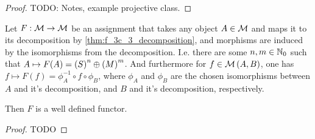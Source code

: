 \begin{lemma}
\begin{enumerate}
{\begin{center}
            \end{center}
        }
    \end{enumerate}
\end{lemma}
\begin{proof}
    TODO: Notes, example projective class.
\end{proof}





\begin{lemma} \label{thm:F_functor} %
    Let \( F: {\mathcal{M}} \to {\mathcal{M}} \) be an assignment that takes any object \( A \in {\mathcal{M}} \) and maps it to its decomposition by \autoref{thm:f_3c_3_decomposition}, and morphisms are induced by the isomorphisms from the decomposition. I.e. there are some \( n, m \in {\mathbb{N}}_0 \) such that \( A \mapsto F(A) = \left(  S  \right)^n \oplus \left(  M  \right)^m \). And furthermore for \( f \in {\mathcal{M}}\left( A, B \right) \), one has \( f \mapsto F(f) = \phi_A^{-1} \circ f \circ \phi_B \), where \( \phi_A \) and \( \phi_B \) are the chosen isomorphisms between \( A \) and it's decomposition, and \( B \) and it's decomposition, respectively.

    Then \( F \) is a well defined functor.
\end{lemma}
\begin{proof}
    TODO
\end{proof}

